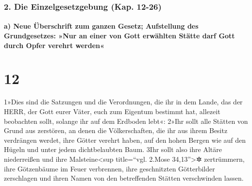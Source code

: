 \hypertarget{die-einzelgesetzgebung-kap.-12-26}{%
\subsubsection{2. Die Einzelgesetzgebung (Kap.
12-26)}\label{die-einzelgesetzgebung-kap.-12-26}}

\hypertarget{a-neue-uxfcberschrift-zum-ganzen-gesetz-aufstellung-des-grundgesetzes-nur-an-einer-von-gott-erwuxe4hlten-stuxe4tte-darf-gott-durch-opfer-verehrt-werden}{%
\paragraph{a) Neue Überschrift zum ganzen Gesetz; Aufstellung des
Grundgesetzes: »Nur an einer von Gott erwählten Stätte darf Gott durch
Opfer verehrt
werden«}\label{a-neue-uxfcberschrift-zum-ganzen-gesetz-aufstellung-des-grundgesetzes-nur-an-einer-von-gott-erwuxe4hlten-stuxe4tte-darf-gott-durch-opfer-verehrt-werden}}

\hypertarget{section-11}{%
\section{12}\label{section-11}}

1»Dies sind die Satzungen und die Verordnungen, die ihr in dem Lande,
das der HERR, der Gott eurer Väter, euch zum Eigentum bestimmt hat,
allezeit beobachten sollt, solange ihr auf dem Erdboden lebt«: 2»Ihr
sollt alle Stätten von Grund aus zerstören, an denen die Völkerschaften,
die ihr aus ihrem Besitz verdrängen werdet, ihre Götter verehrt haben,
auf den hohen Bergen wie auf den Hügeln und unter jedem dichtbelaubten
Baum. 3Ihr sollt also ihre Altäre niederreißen und ihre
Malsteine\textless sup title=``vgl. 2.Mose 34,13''\textgreater✲
zertrümmern, ihre Götzenbäume im Feuer verbrennen, ihre geschnitzten
Götterbilder zerschlagen und ihren Namen von den betreffenden Stätten
verschwinden lassen.

